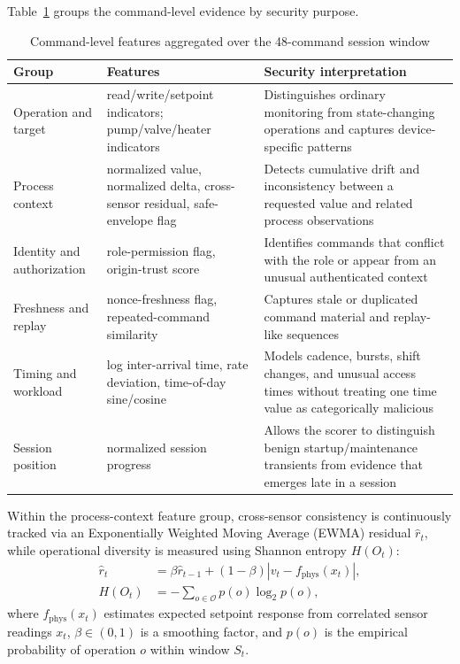 \documentclass[journal]{IEEEtran}
\renewcommand{\arraystretch}{1.08}
\begin{document}
Table~\ref{tab:features} groups the command-level evidence by security purpose.

\begin{table}[t]
\centering
\caption{Command-level features aggregated over the 48-command session window}
\label{tab:features}
\renewcommand{\arraystretch}{1.12}
\begin{tabularx}{\textwidth}{@{}l l X@{}}
\toprule
\textbf{Group} & \textbf{Features} & \textbf{Security interpretation} \\
\midrule
Operation and target & read/write/setpoint indicators; pump/valve/heater indicators & Distinguishes ordinary monitoring from state-changing operations and captures device-specific patterns \\
Process context & normalized value, normalized delta, cross-sensor residual, safe-envelope flag & Detects cumulative drift and inconsistency between a requested value and related process observations \\
Identity and authorization & role-permission flag, origin-trust score & Identifies commands that conflict with the role or appear from an unusual authenticated context \\
Freshness and replay & nonce-freshness flag, repeated-command similarity & Captures stale or duplicated command material and replay-like sequences \\
Timing and workload & log inter-arrival time, rate deviation, time-of-day sine/cosine & Models cadence, bursts, shift changes, and unusual access times without treating one time value as categorically malicious \\
Session position & normalized session progress & Allows the scorer to distinguish benign startup/maintenance transients from evidence that emerges late in a session \\
\bottomrule
\end{tabularx}
\end{table}

Within the process-context feature group, cross-sensor consistency is continuously tracked via an Exponentially Weighted Moving Average (EWMA) residual $\hat{r}_t$, while operational diversity is measured using Shannon entropy $H(O_t)$:
\begin{align}
\hat{r}_t &= \beta \hat{r}_{t-1} + (1-\beta) |v_t - f_{\mathrm{phys}}(x_t)|, \\
H(O_t) &= -\sum_{o \in \mathcal{O}} p(o) \log_2 p(o),
\end{align}
where $f_{\mathrm{phys}}(x_t)$ estimates expected setpoint response from correlated sensor readings $x_t$, $\beta \in (0,1)$ is a smoothing factor, and $p(o)$ is the empirical probability of operation $o$ within window $S_t$.
\end{document}
